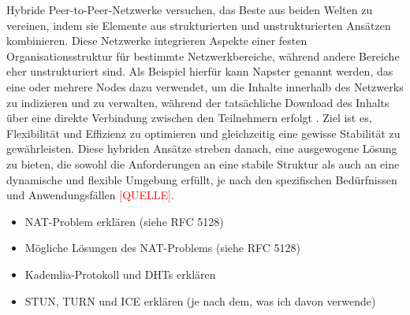 Hybride Peer-to-Peer-Netzwerke versuchen, das Beste aus beiden Welten zu vereinen, indem sie Elemente aus strukturierten und unstrukturierten Ansätzen kombinieren. Diese Netzwerke integrieren Aspekte einer festen Organisationsstruktur für bestimmte Netzwerkbereiche, während andere Bereiche eher unstrukturiert sind. Als Beispiel hierfür kann Napster genannt werden, das eine oder mehrere Nodes dazu verwendet, um die Inhalte innerhalb des Netzwerks zu indizieren und zu verwalten, während der tatsächliche Download des Inhalts über eine direkte Verbindung zwischen den Teilnehmern erfolgt \parencite{Yang_ComparingHybridP2PSystems}.
Ziel ist es, Flexibilität und Effizienz zu optimieren und gleichzeitig eine gewisse Stabilität zu gewährleisten. Diese hybriden Ansätze streben danach, eine ausgewogene Lösung zu bieten, die sowohl die Anforderungen an eine stabile Struktur als auch an eine dynamische und flexible Umgebung erfüllt, je nach den spezifischen Bedürfnissen und Anwendungsfällen \textcolor{red}{[QUELLE]}.





\begin{itemize}
    \item NAT-Problem erklären (siehe RFC 5128)
    \item Mögliche Lösungen des NAT-Problems (siehe RFC 5128)
    \item Kademlia-Protokoll und DHTs erklären
    \item STUN, TURN und ICE erklären (je nach dem, was ich davon verwende)
\end{itemize}